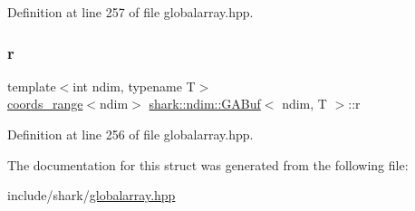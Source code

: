 Definition at line 257 of file globalarray.\+hpp.

\hypertarget{classshark_1_1ndim_1_1_g_a_buf_ad956cb661d537077c40362c8bc371ddf}{}\label{classshark_1_1ndim_1_1_g_a_buf_ad956cb661d537077c40362c8bc371ddf} 
\subsubsection{\texorpdfstring{r}{r}}
{\footnotesize\ttfamily template$<$int ndim, typename T$>$ \\
\hyperlink{structshark_1_1ndim_1_1coords__range}{coords\+\_\+range}$<$ndim$>$ \hyperlink{classshark_1_1ndim_1_1_g_a_buf}{shark\+::ndim\+::\+G\+A\+Buf}$<$ ndim, T $>$\+::r}



Definition at line 256 of file globalarray.\+hpp.



The documentation for this struct was generated from the following file\+:\begin{DoxyCompactItemize}
\item 
include/shark/\hyperlink{globalarray_8hpp}{globalarray.\+hpp}\end{DoxyCompactItemize}
